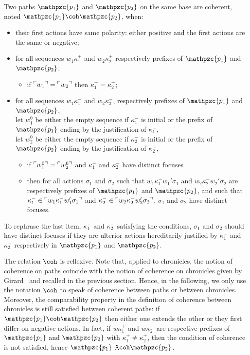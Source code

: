 \documentclass{LMCS}
\newcommand{\design}[1]{{\mathfrak{#1}}}
\newcommand{\pathLL}[1]{\mathpzc{#1}}\newcommand{\strategy}[1]{\pathLL{#1}}\newcommand{\view}[1]{\raisebox{.3ex}{$\ulcorner$}{#1}\raisebox{.3ex}{$\urcorner$}}\newcommand{\fullview}[1]{\raisebox{.3ex}{$\ulcorner\mkern-6mu\ulcorner\mkern-2mu$}{#1}\raisebox{.3ex}{$\mkern-2mu\urcorner\mkern-6mu\urcorner$}}\newcommand{\views}[1]{\view{#1}}\newcommand{\fullviews}[1]{\fullview{#1}}\newcommand{\shuffle}[1]{\llcorner\design{#1}\lrcorner}\newcommand{\PoD}[1]{{\mathcal{P}}_{#1}}\newcommand{\norm}[1]{\llbracket\design{#1}\rrbracket}
\begin{document}
\begin{defi}\label{defi:coherence_path}
Two paths $\pathLL{p_1}$ and $\pathLL{p_2}$ on the same base are
coherent, noted $\pathLL{p_1} \coh \pathLL{p_2}$, when: 
\begin{itemize}[label=$-$]
\item their first actions have same polarity: either positive and the first actions are the same or negative;
\item for all sequences $w_1\kappa_1^+$ and  $w_2\kappa_2^+$ respectively prefixes of $\pathLL{p_1}$ and  $\pathLL{p_2}$:
\begin{itemize}[label=\quad]
\item if $\view{w_1}=\view{w_2}$ then $\kappa^+_1=\kappa^+_2$;
\end{itemize}
\item for all sequences $w_1\kappa_1^-$ and  $w_2\kappa_2^-$, respectively prefixes of $\pathLL{p_1}$ and  $\pathLL{p_2}$, \\
let $w^0_1$ be either the empty sequence if $\kappa_1^-$ is initial or the prefix of $\pathLL{p_1}$ ending by the justification of $\kappa_1^-$, \\
let $w^0_2$ be either the empty sequence if $\kappa_2^-$ is initial or the prefix of $\pathLL{p_2}$ ending by the justification of $\kappa_2^-$,
\begin{itemize}[label=\quad]
\item if $\view{w^0_1}=\view{w^0_2}$ and $\kappa_1^-$ and $\kappa_2^-$ have distinct focuses
\item then for all actions $\sigma_1$ and $\sigma_2$ such that $w_1\kappa_1^-w_1'\sigma_1$  and  $w_2\kappa_2^-w_2'\sigma_2$ are respectively prefixes of $\pathLL{p_1}$ and $\pathLL{p_2}$, and such that  $\kappa^-_1\in\view{w_1\kappa_1^-w_1'\sigma_1}$ and $\kappa_2^-\in\view{w_2\kappa_2^-w_2'\sigma_2}$, $ \sigma_1$ and $\sigma_2$ have distinct focuses.
\end{itemize}
\end{itemize}
To rephrase the last item, $\kappa_1^-$ and $\kappa_2^-$ satisfying the conditions, $\sigma_1$ and $\sigma_2$ should have distinct focuses if they are ulterior actions hereditarily justified by $\kappa_1^-$ and $\kappa_2^-$ respectively in $\pathLL{p_1}$ and $\pathLL{p_2}$.

\end{defi}

The relation $\coh$ is reflexive. 
Note that, applied to chronicles, the notion of coherence on paths coincide with the notion of coherence on chronicles given by Girard~\cite{DBLP:journals/mscs/Girard01} and recalled in the previous section.
Hence, in the following, we only use the notation $\coh$ to speak of coherence between paths or between chronicles.
Moreover, the comparability property in the definition of coherence between chronicles is still satisfied between coherent paths: if $\pathLL{p_1} \coh \pathLL{p_2}$ then either one extends the other or they first differ on negative actions. 
In fact, if $w\kappa_1^+$ and $w\kappa_2^+$ are respective prefixes of $\pathLL{p_1}$ and  $\pathLL{p_2}$ with $\kappa_1^+ \neq \kappa_2^+$, then the condition of coherence is not satisfied, hence $\pathLL{p_1} \not\coh \pathLL{p_2}$.\bigskip
\end{document}
